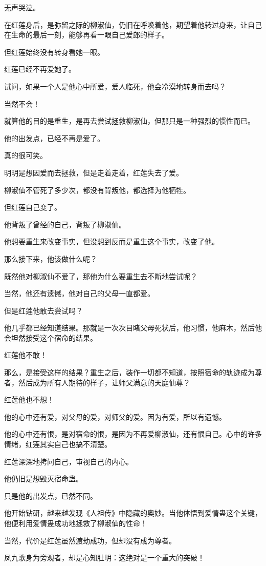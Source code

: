 \begin{this_body}
无声哭泣。

在红莲身后，是弥留之际的柳淑仙，仍旧在呼唤着他，期望着他转过身来，让自己在生命的最后一刻，能够再看一眼自己爱郎的样子。

但红莲始终没有转身看她一眼。

红莲已经不再爱她了。

试问，如果一个人是他心中所爱，爱人临死，他会冷漠地转身而去吗？

当然不会！

就算他的目的是重生，是再去尝试拯救柳淑仙，但那只是一种强烈的惯性而已。

他的出发点，已经不再是爱了。

真的很可笑。

明明是想因爱而去拯救，但是走着走着，红莲失去了爱。

柳淑仙不管死了多少次，都没有背叛他，都选择为他牺牲。

但红莲自己变了。

他背叛了曾经的自己，背叛了柳淑仙。

他想要重生来改变事实，但没想到反而是重生这个事实，改变了他。

那么接下来，他该做什么呢？

既然他对柳淑仙不爱了，那他为什么要重生去不断地尝试呢？

当然，他还有遗憾，他对自己的父母一直都爱。

但是红莲他敢去尝试吗？

他几乎都已经知道结果。那就是一次次目睹父母死状后，他习惯，他麻木，然后他会坦然接受这个宿命的结果。

红莲他不敢！

那么，是接受这样的结果？重生之后，装作一切都不知道，按照宿命的轨迹成为尊者，然后成为所有人期待的样子，让师父满意的天庭仙尊？

红莲他也不想！

他的心中还有爱，对父母的爱，对师父的爱。因为有爱，所以有遗憾。

他的心中还有恨，是对宿命的恨，是因为不再爱柳淑仙，还有恨自己。心中的许多情绪，红莲其实自己也搞不清楚。

红莲深深地拷问自己，审视自己的内心。

他仍旧是想毁灭宿命蛊。

只是他的出发点，已然不同。

他开始钻研，越来越发现《人祖传》中隐藏的奥妙。当他体悟到爱情蛊这个关键，他便利用爱情蛊成功地拯救了柳淑仙的性命！

当然，代价是红莲虽然渡劫成功，但却没有成为尊者。

凤九歌身为旁观者，却是心知肚明：这绝对是一个重大的突破！


\end{this_body}
